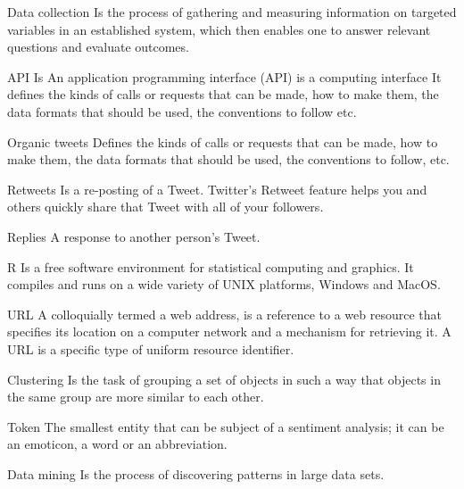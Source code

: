 \begin{glossy}
	\item[Data collection] Is the process of gathering and measuring information on targeted variables in an established system, which then enables one to answer relevant questions and evaluate outcomes. 
	\item[API] Is An application programming interface (API) is a computing interface It defines the kinds of calls or requests that can be made, how to make them, the data formats that should be used, the conventions to follow etc.		
	\item[Organic tweets] Defines the kinds of calls or requests that can be made, how to make them, the data formats that should be used, the conventions to follow, etc.
		
	\item[Retweets] Is a re-posting of a Tweet. Twitter's Retweet feature helps you and others quickly share that Tweet with all of your followers.
	
	\item[Replies] A response to another person's Tweet.
	
	\item[R] Is a free software environment for statistical computing and graphics. It compiles and runs on a wide variety of UNIX platforms, Windows and MacOS.
	
	\item[URL] A colloquially termed a web address, is a reference to a web resource that specifies its location on a computer network and a mechanism for retrieving it. A URL is a specific type of uniform resource identifier.
	
	\item[Clustering] Is the task of grouping a set of objects in such a way that objects in the same group are more similar to each other. 
	\item [Token] The smallest entity that can be subject of a sentiment analysis; it can be an emoticon, a word or an abbreviation.
	\item [Data mining] Is the process of discovering patterns in large data sets.
	
	
\end{glossy}




